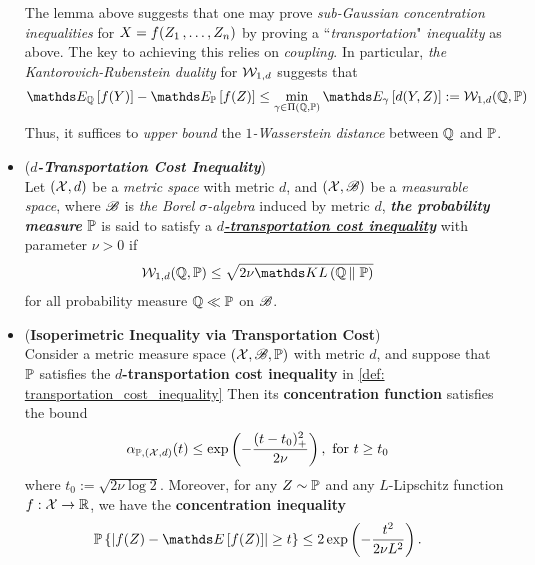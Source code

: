 \documentclass[11pt]{article}
\begin{document}
\begin{itemize}
\begin{remark}
The lemma above suggests that one may prove \emph{sub-Gaussian concentration inequalities} for $X = f(Z_1 \,{,}\ldots{,}\, Z_n)$ by proving a ``\emph{transportation}" \emph{inequality} as above. The key to achieving this relies on \emph{coupling}. In particular, \emph{the Kantorovich-Rubenstein duality} for ${\mathcal W}_{1,d}$  suggests that 
\begin{align*}
\E{\bQ}{f(Y)} - \E{\bP}{f(Z)} \le \min_{\gamma \in \Pi (\bQ, \bP)} \E{\gamma}{d(Y, Z)} := \cW_{1,d}( \bQ, \bP)
\end{align*} Thus, it suffices to \emph{upper bound} the \emph{$1$-Wasserstein distance} between ${\mathbb Q}$ and ${\mathbb P}$.
\end{remark}

\item \begin{definition} (\emph{\textbf{$d$-Transportation Cost Inequality}}) \citep{wainwright2019high}\\
Let $({\mathcal X}, d)$ be a \emph{metric space} with metric $d$,  and $({\mathcal X}, {\mathscr B})$ be a \emph{measurable space}, where ${\mathscr B}$ is \emph{the Borel $\sigma$-algebra} induced by metric $d$, \emph{\textbf{the probability measure}} ${\mathbb P}$ is said to satisfy a \underline{\emph{\textbf{$d$-transportation cost inequality}}} with parameter $\nu > 0$ if
\begin{align}
\cW_{1,d}( \bQ, \bP) &\le \sqrt{2\nu\kl{\bQ}{\bP}}  \label{def: transportation_cost_inequality}
\end{align} for all probability measure ${\mathbb Q} \ll {\mathbb P}$ on ${\mathscr B}$.
\end{definition}

\item \begin{theorem} (\textbf{Isoperimetric Inequality via Transportation Cost})\citep{wainwright2019high}\\
Consider a metric measure space $({\mathcal X}, {\mathscr B}, {\mathbb P})$ with metric $d$, and suppose that ${\mathbb P}$ satisfies the \textbf{$d$-transportation cost inequality} in \eqref{def: transportation_cost_inequality} Then its \textbf{concentration function} satisfies the bound
\begin{align}
\alpha_{{\mathbb P}, ({\mathcal X}, d)}(t) &\le  \exp\left(- \frac{(t -t_0)_{+}^2}{2 \nu}\right), \text{ for }t  \ge t_0 \label{ineqn: concentration_function_transport_cost}
\end{align} where $t_0 := \sqrt{2\nu \log 2}$.  Moreover, for any $Z \sim {\mathbb P}$ and any $L$-Lipschitz function $f : {\mathcal X} \to {\mathbb R}$, we have the \textbf{concentration inequality}
\begin{align}
\bP\set{\abs{f(Z) - \E{}{f(Z)}} \ge t} &\le 2 \exp\paren{- \frac{t^2}{2 \nu L^2}}.  \label{ineqn: lipschitz_concentration_transport_cost}
\end{align}
\end{theorem}
\end{itemize}
\end{document}
